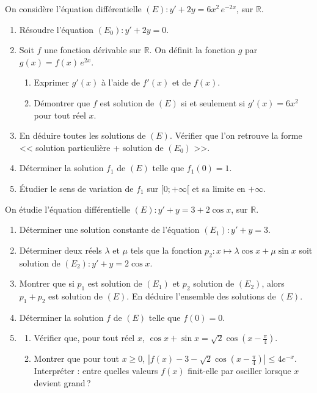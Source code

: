 \begin{exo}
\label{exo:ed changement de fonction}
On consid\`ere l'\'equation diff\'erentielle $(E) : y' + 2y = 6x^2 \, e^{-2x}$, sur $\mathbb{R}$.
\begin{enumerate}
\item R\'esoudre l'\'equation $(E_0) : y' + 2y = 0$.
\item Soit $f$ une fonction d\'erivable sur $\mathbb{R}$. On d\'efinit la fonction $g$ par $g(x) = f(x)\, e^{2x}$.
      \begin{enumerate}
      \item Exprimer $g'(x)$ \`a l'aide de $f'(x)$ et de $f(x)$.
      \item D\'emontrer que $f$ est solution de $(E)$ si et seulement si $g'(x) = 6x^2$ pour tout r\'eel $x$.
      \end{enumerate}
\item En d\'eduire toutes les solutions de $(E)$. V\'erifier que l'on retrouve la forme
      << solution particuli\`ere + solution de $(E_0)$ >>.
\item D\'eterminer la solution $f_1$ de $(E)$ telle que $f_1(0) = 1$.
\item \'Etudier le sens de variation de $f_1$ sur $[0 ; +\infty[$ et sa limite en $+\infty$.
\end{enumerate}
\end{exo}

\begin{exo}
\label{exo:ed superposition}
On \'etudie l'\'equation diff\'erentielle $(E) : y' + y = 3 + 2\cos x$, sur $\mathbb{R}$.
\begin{enumerate}
\item D\'eterminer une solution constante de l'\'equation $(E_1) : y' + y = 3$.
\item D\'eterminer deux r\'eels $\lambda$ et $\mu$ tels que la fonction
      $p_2 : x \mapsto \lambda \cos x + \mu \sin x$ soit solution de $(E_2) : y' + y = 2 \cos x$.
\item Montrer que si $p_1$ est solution de $(E_1)$ et $p_2$ solution de $(E_2)$, alors $p_1 + p_2$ est solution de $(E)$.
      En d\'eduire l'ensemble des solutions de $(E)$.
\item D\'eterminer la solution $f$ de $(E)$ telle que $f(0) = 0$.
\item \begin{enumerate}
      \item V\'erifier que, pour tout r\'eel $x$, $\cos x + \sin x = \sqrt{2} \cos\left(x - \frac{\pi}{4}\right)$.
      \item Montrer que pour tout $x \geq 0$, $\left| f(x) - 3 - \sqrt{2}\cos\left(x - \frac{\pi}{4}\right) \right| \leq 4 e^{-x}$.
            Interpr\'eter : entre quelles valeurs $f(x)$ finit-elle par osciller lorsque $x$ devient grand\,?
      \end{enumerate}
\end{enumerate}
\end{exo}

